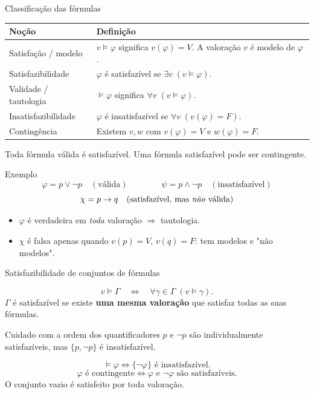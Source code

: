 \documentclass[10pt,aspectratio=169]{beamer}
\newcommand{\dest}[1]{\alert{#1}}
\begin{document}
\begin{frame}{Classificação das fórmulas}

\small
\renewcommand{\arraystretch}{1.45}
\begin{tabular}{p{2.7cm}p{7.9cm}}
\toprule
Noção & Definição\\\midrule
Satisfação / modelo & $v\models\varphi$ significa $v(\varphi)=V$. A valoração $v$ é modelo de $\varphi$.\\
Satisfazibilidade & $\varphi$ é satisfazível se $\exists v\;(v\models\varphi)$.\\
Validade / tautologia & $\models\varphi$ significa $\forall v\;(v\models\varphi)$.\\
Insatisfazibilidade & $\varphi$ é insatisfazível se $\forall v\;(v(\varphi)=F)$.\\
Contingência & Existem $v,w$ com $v(\varphi)=V$ e $w(\varphi)=F$.\\
\bottomrule
\end{tabular}\par
\medskip
Toda fórmula válida é satisfazível. Uma fórmula satisfazível pode ser contingente.
\end{frame}


\begin{frame}{Exemplo}
  \[ \varphi = p \lor \neg p \quad(\text{válida}) \qquad\qquad \psi = p\land \neg p \quad(\text{insatisfazível}) \]
  \[ \chi = p \rightarrow q \quad(\text{satisfazível, mas \emph{não} válida}) \]
  \begin{itemize}
    \item $\varphi$ é verdadeira em \emph{toda} valoração $\Rightarrow$ tautologia.
    \item $\chi$ é falsa apenas quando $v(p)=V,\,v(q)=F$: tem modelos e "não modelos".
  \end{itemize}
\end{frame}


\begin{frame}{Satisfazibilidade de conjuntos de fórmulas}

\[v\models\Gamma\quad\Longleftrightarrow\quad
\forall\gamma\in\Gamma\;(v\models\gamma).\]
$\Gamma$ é \dest{satisfazível} se existe \textbf{uma mesma valoração} que satisfaz todas as suas fórmulas.
\begin{block}{Cuidado com a ordem dos quantificadores}
$p$ e $\neg p$ são individualmente satisfazíveis, mas $\{p,\neg p\}$ é insatisfazível.
\end{block}
\[\models\varphi\iff\{\neg\varphi\}\text{ é insatisfazível}.\]
\[\varphi\text{ é contingente}\iff
\varphi\text{ e }\neg\varphi\text{ são satisfazíveis}.\]
O conjunto vazio é satisfeito por toda valoração.
\end{frame}
\end{document}
